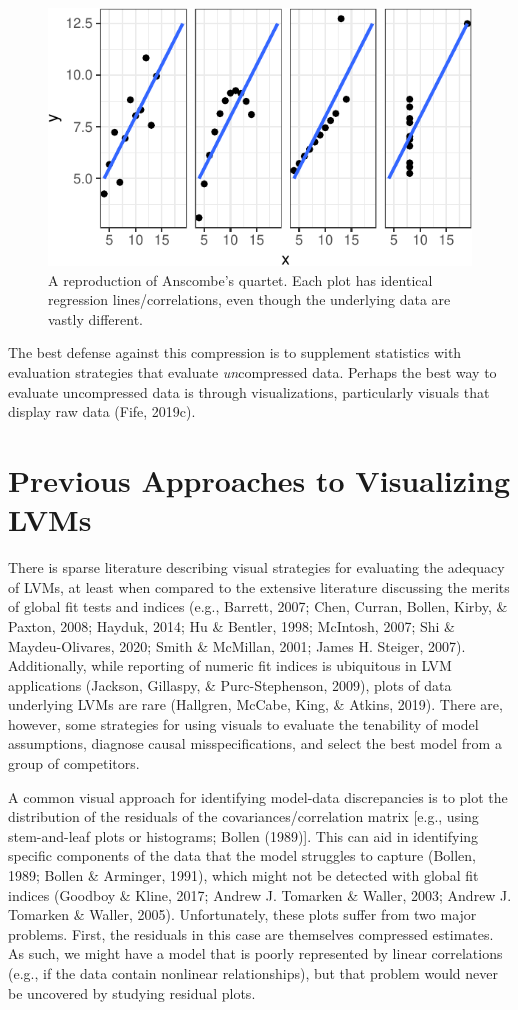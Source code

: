 \documentclass[
  english,
  man]{apa6}
\begin{document}
\begin{figure}

{\centering \includegraphics[width=0.5\linewidth]{flexplavaan_draft_files/figure-latex/anscombe-1} 

}

\caption{A reproduction of Anscombe's quartet. Each plot has identical regression lines/correlations, even though the underlying data are vastly different.}\label{fig:anscombe}
\end{figure}

The best defense against this compression is to supplement statistics with evaluation strategies that evaluate \emph{un}compressed data. Perhaps the best way to evaluate uncompressed data is through visualizations, particularly visuals that display raw data (Fife, 2019c).

\hypertarget{previous-approaches-to-visualizing-lvms}{%
\section{Previous Approaches to Visualizing LVMs}\label{previous-approaches-to-visualizing-lvms}}

There is sparse literature describing visual strategies for evaluating the adequacy of LVMs, at least when compared to the extensive literature discussing the merits of global fit tests and indices (e.g., Barrett, 2007; Chen, Curran, Bollen, Kirby, \& Paxton, 2008; Hayduk, 2014; Hu \& Bentler, 1998; McIntosh, 2007; Shi \& Maydeu-Olivares, 2020; Smith \& McMillan, 2001; James H. Steiger, 2007). Additionally, while reporting of numeric fit indices is ubiquitous in LVM applications (Jackson, Gillaspy, \& Purc-Stephenson, 2009), plots of data underlying LVMs are rare (Hallgren, McCabe, King, \& Atkins, 2019). There are, however, some strategies for using visuals to evaluate the tenability of model assumptions, diagnose causal misspecifications, and select the best model from a group of competitors.

A common visual approach for identifying model-data discrepancies is to plot the distribution of the residuals of the covariances/correlation matrix {[}e.g., using stem-and-leaf plots or histograms; Bollen (1989){]}. This can aid in identifying specific components of the data that the model struggles to capture (Bollen, 1989; Bollen \& Arminger, 1991), which might not be detected with global fit indices (Goodboy \& Kline, 2017; Andrew J. Tomarken \& Waller, 2003; Andrew J. Tomarken \& Waller, 2005). Unfortunately, these plots suffer from two major problems. First, the residuals in this case are themselves compressed estimates. As such, we might have a model that is poorly represented by linear correlations (e.g., if the data contain nonlinear relationships), but that problem would never be uncovered by studying residual plots.
\end{document}
